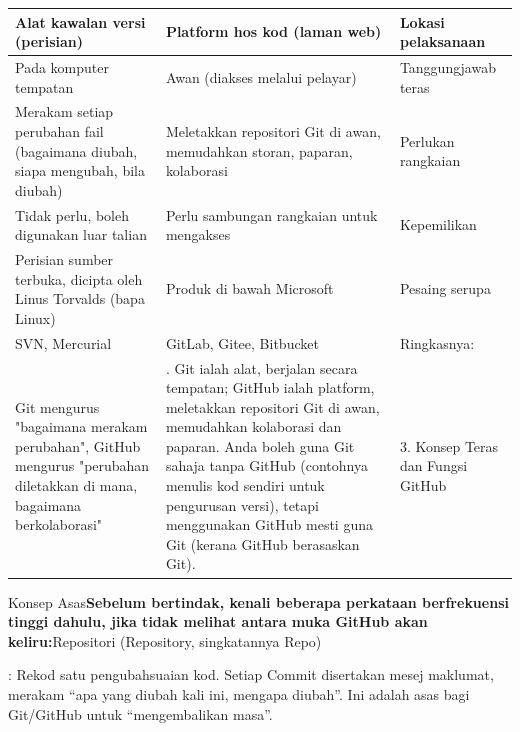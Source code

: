 \begin{center}
\begin{tabularx}{\linewidth}{|X|X|X|}
\hline
\textbf{Alat kawalan versi (perisian)} & \textbf{Platform hos kod (laman web)} & \textbf{Lokasi pelaksanaan} \tabularnewline
\hline
Pada komputer tempatan & Awan (diakses melalui pelayar) & Tanggungjawab teras \tabularnewline
Merakam setiap perubahan fail (bagaimana diubah, siapa mengubah, bila diubah) & Meletakkan repositori Git di awan, memudahkan storan, paparan, kolaborasi & Perlukan rangkaian \tabularnewline
Tidak perlu, boleh digunakan luar talian & Perlu sambungan rangkaian untuk mengakses & Kepemilikan \tabularnewline
Perisian sumber terbuka, dicipta oleh Linus Torvalds (bapa Linux) & Produk di bawah Microsoft & Pesaing serupa \tabularnewline
SVN, Mercurial & GitLab, Gitee, Bitbucket & Ringkasnya: \tabularnewline
Git mengurus "bagaimana merakam perubahan", GitHub mengurus "perubahan diletakkan di mana, bagaimana berkolaborasi" & . Git ialah alat, berjalan secara tempatan; GitHub ialah platform, meletakkan repositori Git di awan, memudahkan kolaborasi dan paparan. Anda boleh guna Git sahaja tanpa GitHub (contohnya menulis kod sendiri untuk pengurusan versi), tetapi menggunakan GitHub mesti guna Git (kerana GitHub berasaskan Git). & 3. Konsep Teras dan Fungsi GitHub \tabularnewline
\hline
\end{tabularx}
\end{center}

Konsep Asas\textbf{Sebelum bertindak, kenali beberapa perkataan berfrekuensi tinggi dahulu, jika tidak melihat antara muka GitHub akan keliru:}Repositori (Repository, singkatannya Repo)



: Rekod satu pengubahsuaian kod. Setiap Commit disertakan mesej maklumat, merakam “apa yang diubah kali ini, mengapa diubah”. Ini adalah asas bagi Git/GitHub untuk “mengembalikan masa”.

